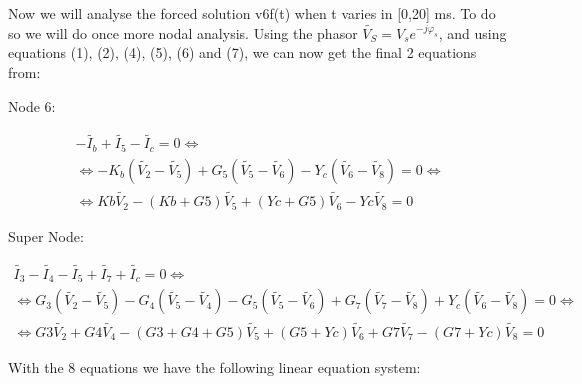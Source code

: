 \hspace{12pt} Now we will analyse the forced solution v6f(t) when t varies in [0,20] ms. To do so we will do once more nodal analysis. Using the phasor $\widetilde{V_S}=V_se^{-j\varphi_s}$, and using equations (1), (2), (4), (5), (6) and (7), we can now get the final 2 equations from:

Node 6:

\begin{gather}
	-\widetilde{I_b}+\widetilde{I_5}-\widetilde{I_c}=0 \iff \nonumber \\
    \iff -K_b(\widetilde{V_2}-\widetilde{V_5})+G_5(\widetilde{V_5}-\widetilde{V_6})-Y_c(\widetilde{V_6}-\widetilde{V_8})=0 \iff \\
    \iff  Kb\widetilde{V_2}-(Kb+G5)\widetilde{V_5}+(Yc+G5)\widetilde{V_6}-Yc\widetilde{V_8}=0 \nonumber
\end{gather}

Super Node:

\begin{gather}
	\widetilde{I_3}-\widetilde{I_4}-\widetilde{I_5}+\widetilde{I_7}+\widetilde{I_c}=0 \iff \nonumber \\
    \iff G_3(\widetilde{V_2}-\widetilde{V_5})-G_4(\widetilde{V_5}-\widetilde{V_4})-G_5(\widetilde{V_5}-\widetilde{V_6})+G_7(\widetilde{V_7}-\widetilde{V_8})+Y_c(\widetilde{V_6}-\widetilde{V_8})=0 \iff \\
    \iff G3\widetilde{V_2}+G4\widetilde{V_4} -(G3+G4+G5)\widetilde{V_5}+(G5+Yc)\widetilde{V_6}+G7\widetilde{V_7}-(G7+Yc)\widetilde{V_8}=0 \nonumber
\end{gather}

With the 8 equations we have the following linear equation system:

\vspace{10pt}

